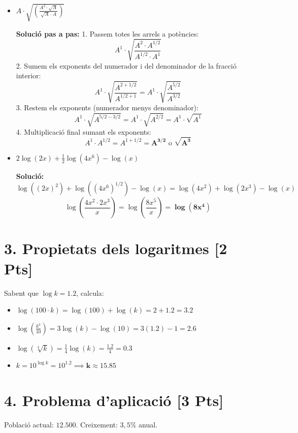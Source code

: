 \documentclass[a4paper,12pt]{article}
\begin{document}
\begin{itemize}
    \item[a)] $A \cdot \sqrt{\left(\frac{A^{2} \cdot \sqrt{A}}{\sqrt{A} \cdot A}\right)}$
    
    \textbf{Solució pas a pas:}
    1. Passem totes les arrels a potències:
    \[ A^1 \cdot \sqrt{\frac{A^2 \cdot A^{1/2}}{A^{1/2} \cdot A^1}} \]
    2. Sumem els exponents del numerador i del denominador de la fracció interior:
    \[ A^1 \cdot \sqrt{\frac{A^{2 + 1/2}}{A^{1/2 + 1}}} = A^1 \cdot \sqrt{\frac{A^{5/2}}{A^{3/2}}} \]
    3. Restem els exponents (numerador menys denominador):
    \[ A^1 \cdot \sqrt{A^{5/2 - 3/2}} = A^1 \cdot \sqrt{A^{2/2}} = A^1 \cdot \sqrt{A^1} \]
    4. Multiplicació final sumant els exponents:
    \[ A^1 \cdot A^{1/2} = A^{1 + 1/2} = \mathbf{A^{3/2}} \text{ o } \mathbf{\sqrt{A^3}} \]

    \item[b)] $2 \log(2x) + \frac{1}{2} \log(4x^{6}) - \log(x)$
    
    \textbf{Solució:}
    \[ \log((2x)^2) + \log((4x^6)^{1/2}) - \log(x) = \log(4x^2) + \log(2x^3) - \log(x) \]
    \[ \log \left( \frac{4x^2 \cdot 2x^3}{x} \right) = \log \left( \frac{8x^5}{x} \right) = \mathbf{\log(8x^4)} \]
\end{itemize}

\section*{3. Propietats dels logaritmes [2 Pts]}
Sabent que $\log k = 1.2$, calcula:

\begin{itemize}
    \item[a)] $\log(100 \cdot k) = \log(100) + \log(k) = 2 + 1.2 = \mathbf{3.2}$
    \item[b)] $\log\left(\frac{k^3}{10}\right) = 3 \log(k) - \log(10) = 3(1.2) - 1 = \mathbf{2.6}$
    \item[c)] $\log(\sqrt[4]{k}) = \frac{1}{4} \log(k) = \frac{1.2}{4} = \mathbf{0.3}$
    \item[d)] $k = 10^{\log k} = 10^{1.2} \implies \mathbf{k \approx 15.85}$
\end{itemize}

\section*{4. Problema d'aplicació [3 Pts]}
Població actual: $12.500$. Creixement: $3,5\%$ anual.
\end{document}
